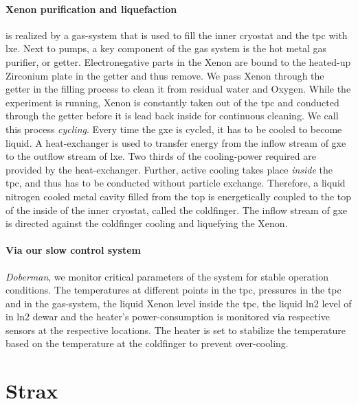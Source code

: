 \paragraph{Xenon purification and liquefaction} is realized by a gas-system that is used to fill the inner cryostat and the \gls{tpc} with \gls{lxe}.
Next to pumps, a key component of the gas system is the hot metal gas purifier, or getter.
Electronegative parts in the Xenon are bound to the heated-up Zirconium plate in the getter and thus remove.
We pass Xenon through the getter in the filling process to clean it from residual water and Oxygen.
While the experiment is running, Xenon is constantly taken out of the \gls{tpc} and conducted through the getter before it is lead back inside for continuous cleaning.
We call this process \emph{cycling}.
Every time the \gls{gxe} is cycled, it has to be cooled to become liquid.
A heat-exchanger is used to transfer energy from the inflow stream of \gls{gxe} to the outflow stream of \gls{lxe}.
Two thirds of the cooling-power required are provided by the heat-exchanger.
Further, active cooling takes place \emph{inside} the \gls{tpc}, and thus has to be conducted without particle exchange.
Therefore, a liquid nitrogen cooled metal cavity filled from the top is energetically coupled to the top of the inside of the inner cryostat, called the coldfinger.  %
The inflow stream of \gls{gxe} is directed against the coldfinger cooling and liquefying the Xenon.


\paragraph{Via our slow control system} \emph{Doberman}, we monitor critical parameters of the system for stable operation conditions.
The temperatures at different points in the \gls{tpc}, pressures in the \gls{tpc} and in the gas-system, the liquid Xenon level inside the \gls{tpc}, the liquid \gls{ln2} level of in \gls{ln2} dewar and the heater's power-consumption is monitored via respective sensors at the respective locations.
The heater is set to stabilize the temperature based on the temperature at the coldfinger to prevent over-cooling.



\newpage
\FloatBarrier
\section{Strax}
\label{sec:Strax}
\FloatBarrier

